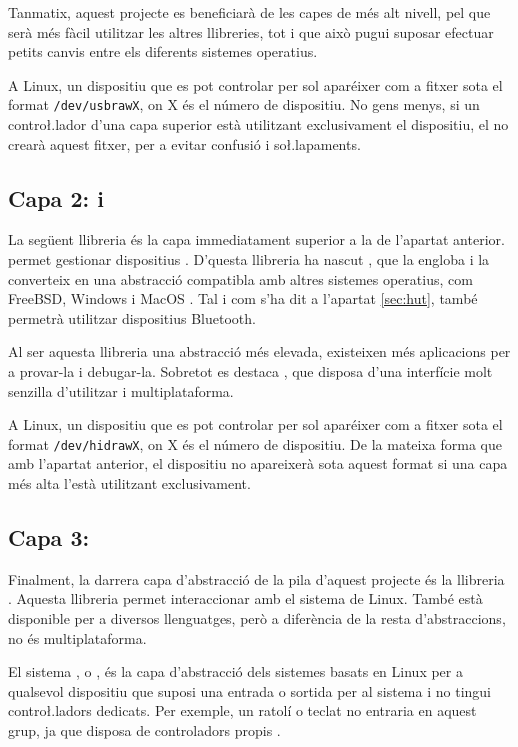Tanmatix, aquest projecte es beneficiarà de les capes de més alt nivell, pel que
serà més fàcil utilitzar les altres llibreries, tot i que això pugui suposar
efectuar petits canvis entre els diferents sistemes operatius.

A Linux, un dispositiu que es pot controlar per  sol aparéixer com
a fitxer sota el format \verb|/dev/usbrawX|, on X és el número de dispositiu.
No gens menys, si un contro\l.lador d'una capa superior està utilitzant
exclusivament el dispositiu, el  no crearà aquest fitxer, per a
evitar confusió i so\l.lapaments.

\subsection{Capa 2:  i }

La següent llibreria és la capa immediatament superior a la de l'apartat
anterior.  permet gestionar dispositius . D'questa
llibreria ha nascut , que la engloba i la converteix en
una abstracció compatibla amb altres sistemes operatius, com
FreeBSD, Windows i MacOS \cite{Libhid}. Tal i com s'ha dit a 
l'apartat \ref{sec:hut}, també permetrà utilitzar dispositius Bluetooth.

Al ser aquesta llibreria una abstracció més elevada, existeixen més aplicacions
per a provar-la i debugar-la. Sobretot es destaca \cite{LibhidUI}, que disposa
d'una interfície molt senzilla d'utilitzar i multiplataforma.

A Linux, un dispositiu que es pot controlar per  sol aparéixer com
a fitxer sota el format \verb|/dev/hidrawX|, on X és el número de dispositiu.
De la mateixa forma que amb l'apartat anterior, el dispositiu no apareixerà
sota aquest format si una capa més alta l'està utilitzant exclusivament.

\subsection{Capa 3: }

Finalment, la darrera capa d'abstracció de la pila d'aquest projecte és la
llibreria .
Aquesta llibreria permet interaccionar amb el sistema
 de Linux. També està disponible per a diversos llenguatges, però
a diferència de la resta d'abstraccions, no és multiplataforma.

El sistema , o , és la capa d'abstracció
dels sistemes basats en Linux per a qualsevol dispositiu que suposi una entrada
o sortida per al sistema i no tingui contro\l.ladors dedicats. Per exemple, un
ratolí o teclat no entraria en aquest grup, ja que disposa de controladors
propis \cite{Iio}.

